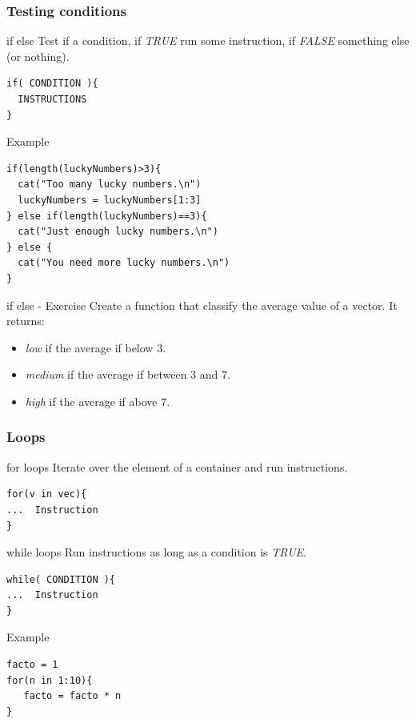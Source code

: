 \documentclass[10pt]{beamer}
\newenvironment{xframe}[2][]
  {\begin{frame}[fragile,environment=xframe,#1]
  \frametitle{#2}}
  {\end{frame}}
\begin{document}
\begin{xframe}{Testing conditions}
  \begin{block}{{\sf if else}}
    Test if a condition, if {\it TRUE} run some instruction, if {\it FALSE} something else (or nothing).
\begin{verbatim}
if( CONDITION ){
  INSTRUCTIONS
} 
\end{verbatim}  
  \end{block}
  \begin{exampleblock}{Example}
\begin{verbatim}
if(length(luckyNumbers)>3){
  cat("Too many lucky numbers.\n")
  luckyNumbers = luckyNumbers[1:3]
} else if(length(luckyNumbers)==3){
  cat("Just enough lucky numbers.\n")
} else {
  cat("You need more lucky numbers.\n")
}
\end{verbatim}  
  \end{exampleblock}
\end{xframe}


\begin{frame}{{\sf if else} - Exercise}
  Create a function that classify the average value of a vector. It returns:
  \begin{itemize}
  \item {\it low} if the average if below $3$.
  \item {\it medium} if the average if between $3$ and $7$.
  \item {\it high} if the average if above $7$.
  \end{itemize}
\end{frame}



\begin{xframe}{Loops}
  \begin{block}{{\sf for} loops}
    Iterate over the element of a container and run instructions.
\begin{verbatim}
for(v in vec){
...  Instruction
}
\end{verbatim}  
  \end{block}
  \begin{block}{{\sf while} loops}
    Run instructions as long as a condition is {\it TRUE}.
\begin{verbatim}
while( CONDITION ){
...  Instruction
}
\end{verbatim}  
  \end{block}
  \begin{exampleblock}{Example}
\begin{verbatim}
facto = 1
for(n in 1:10){
   facto = facto * n
}
\end{verbatim}  
  \end{exampleblock}
\end{xframe}
\end{document}
